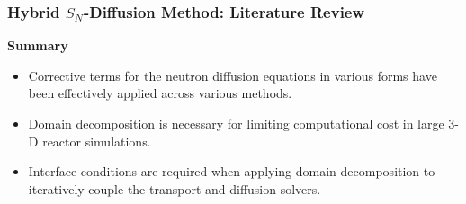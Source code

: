 \begin{frame}
  \frametitle{Hybrid $S_N$-Diffusion Method: Literature Review}
  \begin{block}{\textbf{Summary}}
    \begin{itemize}
      \item Corrective terms for the neutron diffusion equations in various forms have been
        effectively applied across various methods.
      \item Domain decomposition is necessary for limiting computational cost in large 3-D reactor
        simulations.
      \item Interface conditions are required when applying domain decomposition to iteratively
        couple the transport and diffusion solvers.
    \end{itemize}
  \end{block}
\end{frame}
